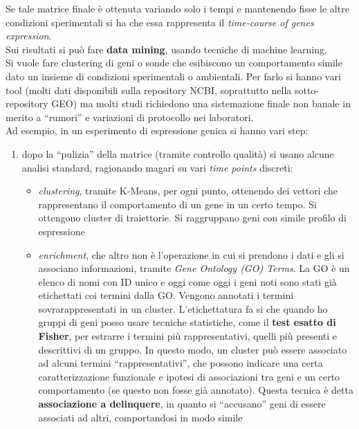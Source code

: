 \documentclass[a4paper,12pt, oneside]{book}
\begin{document}
Se tale matrice finale è ottenuta variando solo i tempi e mantenendo 
fisse le altre condizioni sperimentali si ha che essa rappresenta il
\textit{time-course of genes expression}.\\
Sui risultati si può fare \textbf{data mining}, usando tecniche di machine
learning. \\
Si vuole fare clustering di geni o sonde che esibiscono un comportamento simile
dato un insieme di condizioni sperimentali o ambientali. Per farlo si hanno vari
tool (molti dati disponibili sulla repository NCBI, soprattutto nella
sotto-repository GEO) ma molti studi richiedono
una sistemazione finale non banale in merito a ``rumori'' e variazioni di
protocollo nei laboratori. \\
Ad esempio, in un esperimento di espressione genica si hanno vari step:
\begin{enumerate}
  \item dopo la ``pulizia'' della matrice (tramite controllo qualità) si usano
  alcune analisi standard, ragionando magari su vari \textit{time points}
  discreti: 
  \begin{itemize}
    \item \textit{clustering}, tramite K-Means, per ogni punto, ottenendo dei
    vettori che rappresentano il comportamento  di un gene in un certo tempo. Si
    ottengono cluster di traiettorie. Si raggruppano geni con simile profilo di
    espressione 
    \item \textit{enrichment}, che altro non è l'operazione in cui si prendono i
    dati e gli si associano informazioni, tramite \textit{Gene Ontology (GO)
      Terms}. La GO è un elenco di nomi con ID unico e oggi come oggi i geni
    noti sono stati già etichettati coi termini dalla GO. Vengono annotati i
    termini sovrarappresentati in un cluster. L'etichettatura fa si che quando
    ho gruppi di geni posso usare tecniche statistiche, come il \textbf{test
      esatto di Fisher}, per estrarre i termini più rappresentativi, quelli più
    presenti e descrittivi di un gruppo. In 
    questo modo, un cluster può essere associato ad alcuni termini
    ``rappresentativi'', che possono indicare una certa caratterizzazione
    funzionale e ipotesi di associazioni tra geni e un certo comportamento (se
    questo non fosse già annotato). Questa tecnica è detta \textbf{associazione
      a delinquere}, in quanto si ``accusano'' geni di essere associati ad
    altri, comportandosi in modo simile
  \end{itemize}
\end{enumerate}
\end{document}
